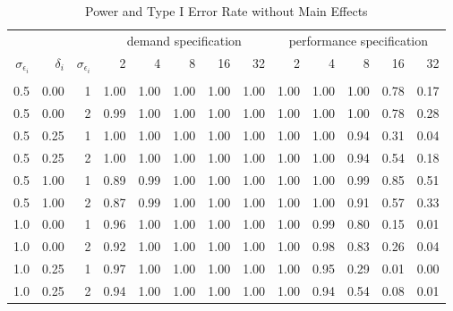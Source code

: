 \begin{table}

\caption{\label{tab:big-main-table}Power and Type I Error Rate without Main Effects}
\centering
\fontsize{9}{11}\selectfont
\begin{threeparttable}
\begin{tabular}[t]{rrrrrrrrrrrrr}
\toprule
\multicolumn{3}{c}{ } & \multicolumn{5}{c}{demand specification} & \multicolumn{5}{c}{performance specification} \\
\cmidrule(l{3pt}r{3pt}){4-8} \cmidrule(l{3pt}r{3pt}){9-13}
$\sigma_{\epsilon_i}$ & $\delta_i$ & $\sigma_{\epsilon_i}$ & 2 & 4 & 8 & 16 & 32 & 2 & 4 & 8 & 16 & 32\\
\midrule
\addlinespace[0.3em]
\multicolumn{13}{c}{\textbf{Power}}\\
\hspace{1em}0.5 & 0.00 & 1 & 1.00 & 1.00 & 1.00 & 1.00 & 1.00 & 1.00 & 1.00 & 1.00 & 0.78 & 0.17\\
\hspace{1em}0.5 & 0.00 & 2 & 0.99 & 1.00 & 1.00 & 1.00 & 1.00 & 1.00 & 1.00 & 1.00 & 0.78 & 0.28\\
\hspace{1em}0.5 & 0.25 & 1 & 1.00 & 1.00 & 1.00 & 1.00 & 1.00 & 1.00 & 1.00 & 0.94 & 0.31 & 0.04\\
\hspace{1em}0.5 & 0.25 & 2 & 1.00 & 1.00 & 1.00 & 1.00 & 1.00 & 1.00 & 1.00 & 0.94 & 0.54 & 0.18\\
\hspace{1em}0.5 & 1.00 & 1 & 0.89 & 0.99 & 1.00 & 1.00 & 1.00 & 1.00 & 1.00 & 0.99 & 0.85 & 0.51\\
\hspace{1em}0.5 & 1.00 & 2 & 0.87 & 0.99 & 1.00 & 1.00 & 1.00 & 1.00 & 1.00 & 0.91 & 0.57 & 0.33\\
\hspace{1em}1.0 & 0.00 & 1 & 0.96 & 1.00 & 1.00 & 1.00 & 1.00 & 1.00 & 0.99 & 0.80 & 0.15 & 0.01\\
\hspace{1em}1.0 & 0.00 & 2 & 0.92 & 1.00 & 1.00 & 1.00 & 1.00 & 1.00 & 0.98 & 0.83 & 0.26 & 0.04\\
\hspace{1em}1.0 & 0.25 & 1 & 0.97 & 1.00 & 1.00 & 1.00 & 1.00 & 1.00 & 0.95 & 0.29 & 0.01 & 0.00\\
\hspace{1em}1.0 & 0.25 & 2 & 0.94 & 1.00 & 1.00 & 1.00 & 1.00 & 1.00 & 0.94 & 0.54 & 0.08 & 0.01\\

\end{tabular}
\end{threeparttable}
\end{table}
